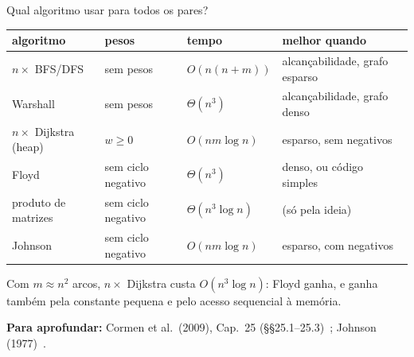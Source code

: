 \documentclass[aspectratio=169,xcolor=table]{beamer}
\newcommand{\fonte}[1]{%
  \vfill
  {\tiny\color{gray!55!black}\textbf{Para aprofundar:} #1\par}%
}
\begin{document}
\begin{frame}{Qual algoritmo usar para todos os pares?}
  \begin{center}
  \scriptsize
  \begin{tabular}{llll}
    \toprule
    algoritmo & pesos & tempo & melhor quando \\
    \midrule
    $n\times$ BFS/DFS & sem pesos & $O(n(n+m))$ & alcançabilidade, grafo esparso \\
    Warshall & sem pesos & $\Theta(n^3)$ & alcançabilidade, grafo denso \\
    $n\times$ Dijkstra (heap) & $w \ge 0$ & $O(nm\log n)$ & esparso, sem negativos \\
    Floyd & sem ciclo negativo & $\Theta(n^3)$ & denso, ou código simples \\
    produto de matrizes & sem ciclo negativo & $\Theta(n^3\log n)$ & (só pela ideia) \\
    Johnson & sem ciclo negativo & $O(nm\log n)$ & esparso, com negativos \\
    \bottomrule
  \end{tabular}
  \end{center}
  \medskip
  {\scriptsize Com $m \approx n^2$ arcos, $n\times$ Dijkstra custa $O(n^3\log n)$: Floyd ganha,
  e ganha também pela constante pequena e pelo acesso sequencial à memória.\par}
  \fonte{Cormen et al.\ (2009), Cap.\ 25 (\S\S 25.1--25.3)~\cite{cormen2009introduction};
    Johnson (1977)~\cite{johnson1977efficient}.}
\end{frame}
\end{document}
